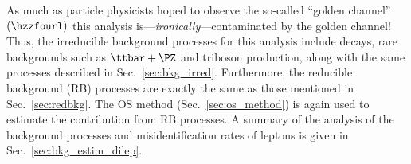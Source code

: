 As much as particle physicists hoped to observe the so-called ``golden channel'' $\left( \hzzfourl \right)$
this analysis is---\emph{ironically}---contaminated by the golden channel!
Thus, the irreducible background processes for this analysis include \htofourl decays, rare backgrounds such as $\ttbar + \PZ$ and triboson production, along with the same processes described in Sec.~\ref{sec:bkg_irred}.
Furthermore, the reducible background (RB) processes are exactly the same as those mentioned in Sec.~\ref{sec:redbkg}.
The OS method (Sec.~\ref{sec:os_method}) is again used to estimate the contribution from RB processes.
A summary of the analysis of the background processes and misidentification rates of leptons is given in Sec.~\ref{sec:bkg_estim_dilep}.

